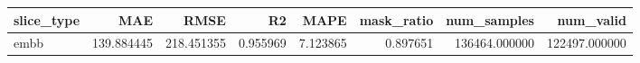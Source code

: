 \begin{tabular}{lrrrrrrr}
\toprule
slice_type & MAE & RMSE & R2 & MAPE & mask_ratio & num_samples & num_valid \\
\midrule
embb & 139.884445 & 218.451355 & 0.955969 & 7.123865 & 0.897651 & 136464.000000 & 122497.000000 \\
\bottomrule
\end{tabular}
